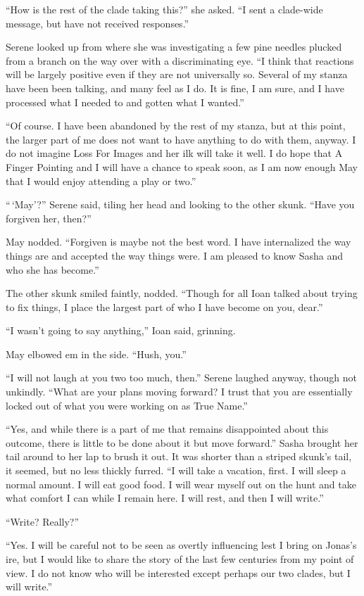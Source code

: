 ``How is the rest of the clade taking this?'' she asked. ``I sent a clade-wide message, but have not received responses.''

Serene looked up from where she was investigating a few pine needles plucked from a branch on the way over with a discriminating eye. ``I think that reactions will be largely positive even if they are not universally so. Several of my stanza have been been talking, and many feel as I do. It is fine, I am sure, and I have processed what I needed to and gotten what I wanted.''

``Of course. I have been abandoned by the rest of my stanza, but at this point, the larger part of me does not want to have anything to do with them, anyway. I do not imagine Loss For Images and her ilk will take it well. I do hope that A Finger Pointing and I will have a chance to speak soon, as I am now enough May that I would enjoy attending a play or two.''

``\,`May'?'' Serene said, tiling her head and looking to the other skunk. ``Have you forgiven her, then?''

May nodded. ``Forgiven is maybe not the best word. I have internalized the way things are and accepted the way things were. I am pleased to know Sasha and who she has become.''

The other skunk smiled faintly, nodded. ``Though for all Ioan talked about trying to fix things, I place the largest part of who I have become on you, dear.''

``I wasn't going to say anything,'' Ioan said, grinning.

May elbowed em in the side. ``Hush, you.''

``I will not laugh at you two too much, then.'' Serene laughed anyway, though not unkindly. ``What are your plans moving forward? I trust that you are essentially locked out of what you were working on as True Name.''

``Yes, and while there is a part of me that remains disappointed about this outcome, there is little to be done about it but move forward.'' Sasha brought her tail around to her lap to brush it out. It was shorter than a striped skunk's tail, it seemed, but no less thickly furred. ``I will take a vacation, first. I will sleep a normal amount. I will eat good food. I will wear myself out on the hunt and take what comfort I can while I remain here. I will rest, and then I will write.''

``Write? Really?''

``Yes. I will be careful not to be seen as overtly influencing lest I bring on Jonas's ire, but I would like to share the story of the last few centuries from my point of view. I do not know who will be interested except perhaps our two clades, but I will write.''

